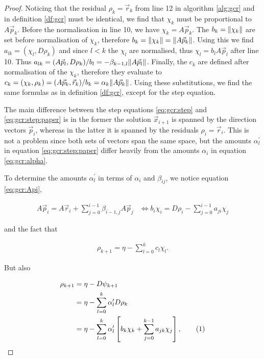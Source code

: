 \documentclass{article}
\newcommand\numberthis{\addtocounter{equation}{1}\tag{\theequation}}
\theoremstyle{plain} %
\theoremstyle{convention} %
\theoremstyle{remark} %
\numberwithin{equation}{section}
\begin{document}
\begin{proof}

Noticing that the residual $\rho_k = \vec{r}_k$ from line \num{12} in algorithm \ref{alg:gcr} and in definition \ref{df:gcr} must be identical, we find that $\chi_k$ must be proportional to $A \vec{p}_k$. Before the normalisation in line \num{10}, we have $\chi_k = A \vec{p}_k$. The $b_k = \norm{\chi_k}$ are set before normalisation of $\chi_k$, therefore $b_k = \norm{\chi_k} = \norm{A \vec{p}_k}$. Using this we find $a_{lk} = (\chi_l, D \rho_k)$ and since $l < k$ the $\chi_l$ are normalised, thus $\chi_l = b_l A \vec{p}_l$ after line \num{10}. Thus $a_{lk} = (A \vec{p}_l, D \rho_k)/b_l = - \beta_{k-1,l} \norm{A \vec{p}_l}$. Finally, the $c_k$ are defined after normalisation of the $\chi_k$, therefore they evaluate to $c_k = (\chi_k, \rho_k) = (A \vec{p}_k, \vec{r}_k)/b_k = \alpha_k \norm{A \vec{p}_k}$. Using these substitutions, we find the same formulas as in definition \ref{df:gcr}, except for the step equation.

The main difference between the step equations \eqref{eq:gcr:step} and \eqref{eq:gcr:step:paper} is in the former the solution $\vec{x}_{i+1}$ is spanned by the direction vectors $\vec{p}_i$, whereas in the latter it is spanned by the residuals $\rho_i = \vec{r}_i$. This is not a problem since both sets of vectors span the same space, but the amounts $\alpha^{\prime}_l$ in equation \eqref{eq:gcr:step:paper} differ heavily from the amounts $\alpha_i$ in equation \eqref{eq:gcr:alpha}.

To determine the amounts $\alpha^{\prime}_l$ in terms of $\alpha_i$ and $\beta_{ij}$, we notice equation \eqref{eq:gcr:Api},

\begin{align}
    A \vec{p}_{i} = A \vec{r}_{i} + \sum_{j=0}^{i-1} \beta_{i-1,j} A \vec{p}_j &\iff b_{i} \chi_{i} = D \rho_i - \sum_{j=0}^{i-1} a_{ji} \chi_j \label{eq:gcr:Api:equiv}
\end{align}

and the fact that

\begin{align}
    \rho_{k+1} = \eta - \sum_{l=0}^k c_l \chi_l. \label{eq:gcr:paper:rho1}
\end{align}

But also 

\begin{align*}
    \rho_{k+1} &= \eta - D \psi_{k+1} \\
    &= \eta - \sum_{l=0}^k \alpha^{\prime}_l D \rho_k \\
    &= \eta - \sum_{l=0}^k \alpha^{\prime}_l \left[ b_k \chi_k + \sum_{j=0}^{k-1} a_{jk} \chi_j \right], \numberthis \label{eq:gcr:paper:rho2}
\end{align*}    


\end{proof}
\end{document}
